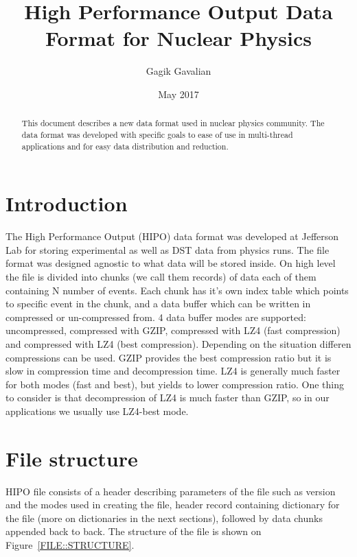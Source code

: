 \documentclass[12pt]{article}
\title{High Performance Output Data Format for Nuclear Physics}
\author{Gagik Gavalian}
\date{May 2017}
\begin{document}
\begin{titlepage}
\maketitle
\begin{abstract}
This document describes a new data format used in nuclear physics community.
The data format was developed with specific goals to ease of use in multi-thread 
applications and for easy data distribution and reduction.
\end{abstract}
\end{titlepage}

\section{Introduction}

The High Performance Output (HIPO) data format was developed at Jefferson Lab
for storing experimental as well as DST data from physics runs. The file format
was designed agnostic to what data will be stored inside. On high level the file
is divided into chunks (we call them records) of data each of them containing N number
of events. Each chunk has it's own index table which points to specific event in the
chunk, and a data buffer which can be written in compressed or un-compressed from.
4 data buffer modes are supported: uncompressed, compressed with GZIP, compressed
with LZ4 (fast compression) and compressed with LZ4 (best compression). Depending
on the situation differen compressions can be used. GZIP provides the best compression
ratio but it is slow in compression time and decompression time. LZ4 is generally much
faster for both modes (fast and best), but yields to lower compression ratio. One thing 
to consider is that decompression of LZ4 is much faster than GZIP, so in our applications
we usually use LZ4-best mode.


\section{File structure}

HIPO file consists of a header describing parameters of the file such as version and the 
modes used in creating the file, header record containing dictionary for the file (more on
dictionaries in the next sections), followed by data chunks appended back to back.
The structure of the file is shown on Figure~\ref{FILE::STRUCTURE}.

\end{document}
